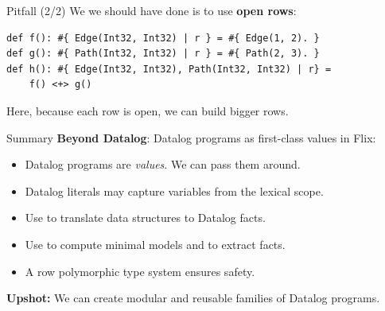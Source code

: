 \begin{frame}[fragile]{Pitfall (2/2)}
We we should have done is to use \textbf{open rows}:

\begin{lstlisting}[language=flix, xleftmargin=0.8cm]
def f(): #{ Edge(Int32, Int32) | r } = #{ Edge(1, 2). }
def g(): #{ Path(Int32, Int32) | r } = #{ Path(2, 3). }
def h(): #{ Edge(Int32, Int32), Path(Int32, Int32) | r} = 
    f() <+> g()
\end{lstlisting}

Here, because each row is open, we can build bigger rows.
\end{frame}

\begin{frame}{Summary}
\textbf{Beyond Datalog}: Datalog programs as first-class values in Flix:

\begin{itemize}
    \item Datalog programs are \emph{values}. We can pass them around.
    \item Datalog literals may capture variables from the lexical scope.
    \item Use  to translate data structures to Datalog facts.
    \item Use  to compute minimal models and to extract facts.
    \item A row polymorphic type system ensures safety.
\end{itemize}

\textbf{Upshot:} We can create modular and reusable families of Datalog programs.
\end{frame}

\begin{frame}[standout]
\end{frame}

